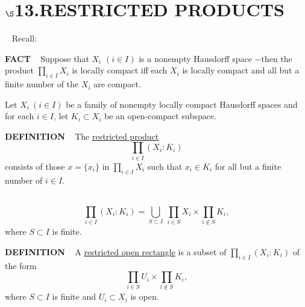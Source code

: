 \chapter{
$\boldsymbol{\S}$\textbf{13}.\quad  RESTRICTED PRODUCTS}
\setlength\parindent{2em}
\setcounter{theoremn}{0}

\ \indent 
Recall:

\begin{x}{\small\bf FACT} \ %
Suppose that $X_i$ $(i \in I)$ is a nonempty Hausdorff space $-$then the product 
$\prod\limits_{i \in I} X_i$ is locally compact iff each 
$X_i$ is locally compact and all but a finite number of the $X_i$ are compact.
\end{x}

\vspace{0.1cm}


Let $X_i \  (i \in I)$ be a family of nonempty locally compact Hausdorff spaces and for each 
$i \in I$, let $K_i \subset X_i$ be an open-compact subspace.
\begin{x}{\small\bf DEFINITION} \ %
The 
\underline{restricted product}
\[
\prod\limits_{i \in I} (X_i : K_i)
\]
consists of those $x = \{x_i\}$ in $\prod\limits_{i \in I} X_i$ such that $x_i \in K_i$ for all but a finite number of $i \in I$. 
\end{x}

\vspace{0.1cm}

\begin{x}{\small\bf {}} \ %
\[
\prod_{i \in I} (X_i : K_i) = \bigcup_{S \subset I} \ \prod_{i \in S} X_i \times \prod_{i \notin S} K_i,
\]
where $S \subset I$ is finite.
\end{x}

\vspace{0.1cm}

\begin{x}{\small\bf DEFINITION} \ %
A 
\underline{restricted open rectangle}
is a subset of $\prod\limits_{i \in I} (X_i : K_i)$ of the form
\[
\prod_{i \in S} U_i \times \prod_{i \notin S} K_i,
\]
where $S \subset I$ is finite and $U_i \subset X_i$ is open.
\end{x}

\vspace{0.1cm}


